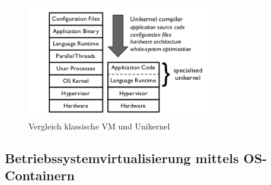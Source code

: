 \begin{figure}[!ht]
  \begin{center}
    \includegraphics[width=8cm]{bilder/comparison-vm-unikernel.png}
    \caption{Vergleich klassische VM und Unikernel \citep[Abb. 1]{MadMorAnd13}}
  \end{center}
\end{figure}

\subsection{Betriebssystemvirtualisierung mittels OS-Containern}
